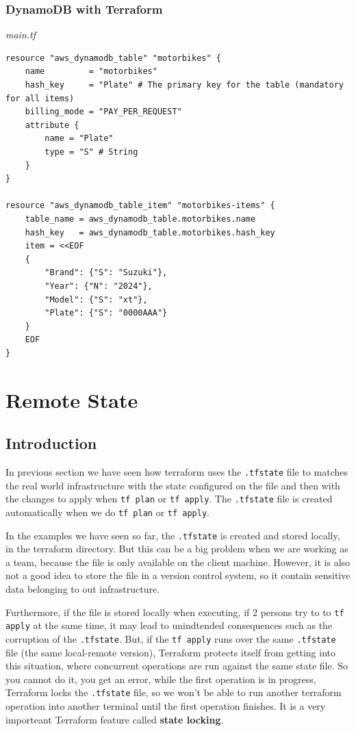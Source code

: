 \documentclass{article}
\newenvironment{codetemplate}[1][]{%
  \mybasecolorbox[#1]
  \itshape
}{%
  \endmybasecolorbox
}
\begin{document}
\subsubsection{DynamoDB with Terraform}

\begin{codetemplate}{main.tf}
\begin{verbatim}
resource "aws_dynamodb_table" "motorbikes" {
    name         = "motorbikes"
    hash_key     = "Plate" # The primary key for the table (mandatory for all items)
    billing_mode = "PAY_PER_REQUEST"
    attribute {
        name = "Plate"
        type = "S" # String
    }
}

resource "aws_dynamodb_table_item" "motorbikes-items" {
    table_name = aws_dynamodb_table.motorbikes.name
    hash_key   = aws_dynamodb_table.motorbikes.hash_key
    item = <<EOF
    {
        "Brand": {"S": "Suzuki"},
        "Year": {"N": "2024"},
        "Model": {"S": "xt"},
        "Plate": {"S": "0000AAA"}
    }
    EOF
}
\end{verbatim}
\end{codetemplate}

\section{Remote State}

\subsection{Introduction}
In previous section we have seen how terraform uses the \verb+.tfstate+ file to matches the real world infrastructure with the state configured on the file and then with the changes to apply when \verb+tf plan+ or \verb+tf apply+. The \verb+.tfstate+ file is created automatically when we do \verb+tf plan+ or \verb+tf apply+.

In the examples we have seen so far, the \verb|.tfstate| is created and stored locally, in the terraform directory. But this can be a big problem when we are working as a team, because the file is only available on the client machine. However, it is also not a good idea to store the file in a version control system, so it contain sensitive data belonging to out infrastructure. 

Furthermore, if the file is stored locally when executing, if 2 persons try to to \verb+tf apply+ at the same time, it may lead to unindtended consequences such as the corruption of the \verb*|.tfstate|. But, if the \verb|tf apply| runs over the same \verb|.tfstate| file (the same local-remote version), Terraform protects itself from getting into this situation, where concurrent operations are run against the same state file. So you cannot do it, you get an error, while the first operation is in progress, Terraform locks the \verb|.tfstate| file, so we won't be able to run another terraform operation into another terminal until the first operation finishes. It is a very importeant Terraform feature called \textbf{state locking}.
\end{document}
